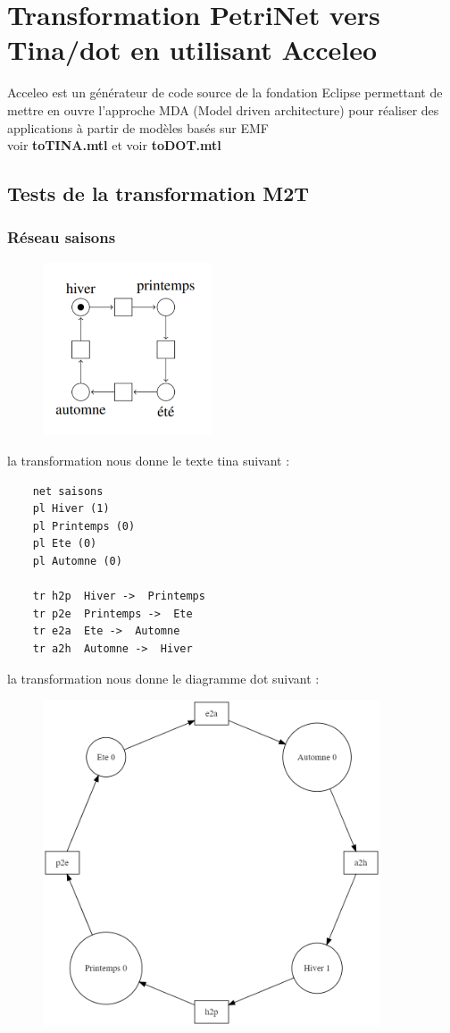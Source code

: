 \documentclass{article}
\begin{document}
\section{Transformation PetriNet vers Tina/dot en utilisant Acceleo}
Acceleo est un générateur de code source de la fondation Eclipse permettant de mettre en ouvre 
l'approche MDA (Model driven architecture) pour réaliser des applications à partir de modèles basés sur EMF \\
voir \textbf{toTINA.mtl} et voir \textbf{toDOT.mtl}
\subsection{Tests de la transformation M2T}
\subsubsection{Réseau saisons}
\begin{figure}[H]
    \centering
    \includegraphics[width = 5cm]{net-saisons.png}
\end{figure}
la transformation nous donne le texte tina suivant :
\begin{verbatim}
    net saisons
    pl Hiver (1)
    pl Printemps (0)
    pl Ete (0)
    pl Automne (0)

    tr h2p  Hiver ->  Printemps
    tr p2e  Printemps ->  Ete
    tr e2a  Ete ->  Automne
    tr a2h  Automne ->  Hiver
\end{verbatim}
la transformation nous donne le diagramme dot suivant :
\begin{figure}[H]
    \centering
    \includegraphics[width = 10cm]{dot-saisons.png}
\end{figure}
\end{document}
